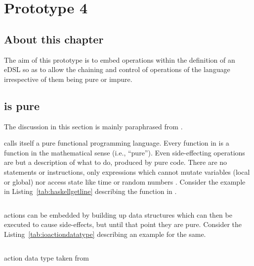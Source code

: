 \documentclass[thesis-solanki.tex]{subfiles}
\begin{document}
\chapter{Prototype 4}{\label{proto4}}


\section{About this chapter}
The aim of this prototype is to embed  operations within the definition of an eDSL so as to allow the chaining and 
control of operations of the language irrespective of them being pure or impure.

\section{  is pure}

The discussion in this section is mainly paraphrased from \cite{website:ioispurechristaylor}.

 calls itself a pure functional programming language. Every function in  is a function in the mathematical sense (i.e., ``pure'').
 Even side-effecting  operations are but a description of what to do, produced by pure code. There are no statements or instructions, 
 only expressions which cannot mutate variables (local or global) nor access state like time or random numbers \cite{website:haskellorg}. Consider the
 example in Listing~\ref{tab:haskellgetline} describing the  function in . 

\begin{code-list}[H]
\begin{singlespace}
\inputminted{haskell}{haskell-proto4-haskell-getLine.hs}
\end{singlespace}
\caption{ }
\label{tab:haskellgetline}
\end{code-list}

 actions can be embedded by building up data structures which can then be executed to cause side-effects, but until that point they 
are pure. Consider the Listing~\ref{tab:ioactiondatatype} describing an example for the same.

\begin{code-list}[H]
\begin{singlespace}
\inputminted{haskell}{haskell-proto4-ioaction-datatype.hs}
\end{singlespace}
\caption{ action data type taken from \cite{website:ioispurechristaylor}}
\label{tab:ioactiondatatype}
\end{code-list}
\end{document}
